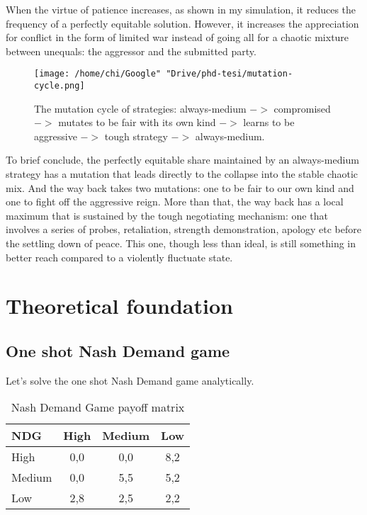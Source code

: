 \documentclass[12.5pt]{report}
\begin{document}
When the virtue of patience increases, as shown in my simulation, it reduces the frequency of a perfectly equitable solution. However, it increases the appreciation for conflict in the form of limited war instead of going all for a chaotic mixture between unequals: the aggressor and the submitted party. \\

\begin{figure}
\center
\texttt{[image: /home/chi/Google" "Drive/phd-tesi/mutation-cycle.png]}
\caption{The mutation cycle of strategies: always-medium $->$ compromised $->$ mutates to be fair with its own kind $->$ learns to be aggressive $->$ tough strategy $->$ always-medium.}
\end{figure}


To brief conclude, the perfectly equitable share maintained by an always-medium strategy has a mutation that leads directly to the collapse into the stable chaotic mix. And the way back takes two mutations: one to be fair to our own kind and one to fight off the aggressive reign. More than that, the way back has a local maximum that is sustained by the tough negotiating mechanism: one that involves a series of probes, retaliation, strength demonstration, apology etc before the settling down of peace. This one, though less than ideal, is still something in better reach compared to a violently fluctuate state.\\




\section{Theoretical foundation}

\subsection{One shot Nash Demand game}

Let's solve the one shot Nash Demand game analytically.


\begin{table}
\center
\begin{tabular}{l|ccc}
\textbf{NDG}&High& Medium&Low\\
\hline
High & 0,0 & 0,0& 8,2\\
Medium & 0,0 & 5,5 &5,2\\
Low & 2,8&2,5&2,2\\
\end{tabular}
\caption{Nash Demand Game payoff matrix}
\end{table}
\end{document}
